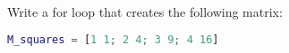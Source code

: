 Write a for loop that creates the following matrix:

\begin{lstlisting}[language=Matlab]
M_squares = [1 1; 2 4; 3 9; 4 16]
\end{lstlisting}

\begin{solution}\ \\

\end{solution}